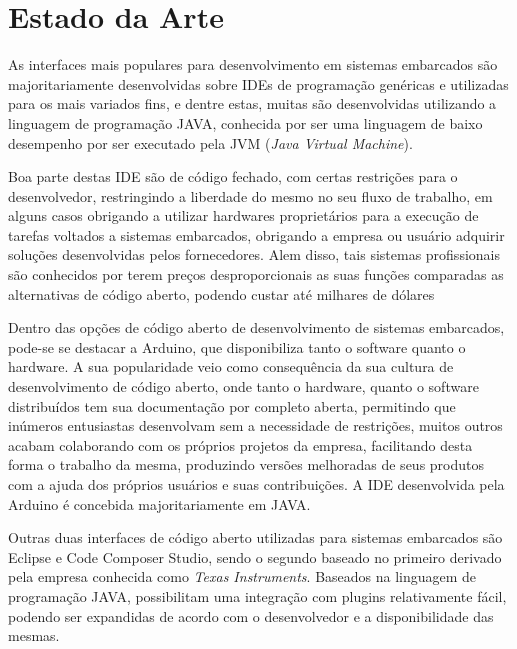 \chapter{Estado da Arte}
As interfaces mais populares para desenvolvimento em sistemas embarcados são majoritariamente desenvolvidas sobre IDEs de programação genéricas e utilizadas para os mais variados fins, e dentre estas, muitas são desenvolvidas utilizando a linguagem de programação JAVA, conhecida por ser uma linguagem de baixo desempenho por ser executado pela JVM (\textit{Java Virtual Machine})\cite{javaisbad}.


Boa parte destas IDE são de código fechado, com certas restrições para o desenvolvedor, restringindo a liberdade do mesmo no seu fluxo de trabalho, em alguns casos obrigando a utilizar hardwares proprietários para a execução de tarefas voltados a sistemas embarcados, obrigando a empresa ou usuário adquirir soluções desenvolvidas pelos fornecedores. Alem disso, tais sistemas profissionais são conhecidos por terem preços desproporcionais as suas funções comparadas as alternativas de código aberto, podendo custar até milhares de dólares %

Dentro das opções de código aberto de desenvolvimento de sistemas embarcados, pode-se se destacar a Arduino, que disponibiliza tanto o software quanto o hardware. A sua popularidade veio como consequência da sua cultura de desenvolvimento de código aberto, onde tanto o hardware, quanto o software distribuídos tem sua documentação por completo aberta, permitindo que inúmeros entusiastas desenvolvam sem a necessidade de restrições, muitos outros acabam colaborando com os próprios projetos da empresa, facilitando desta forma o trabalho da mesma, produzindo versões melhoradas de seus produtos com a ajuda dos próprios usuários e suas contribuições. A IDE desenvolvida pela Arduino é concebida majoritariamente em JAVA.

Outras duas interfaces de código aberto utilizadas para sistemas embarcados são Eclipse e Code Composer Studio, sendo o segundo baseado no primeiro
derivado pela empresa conhecida como \textit{Texas Instruments}. Baseados na linguagem de programação JAVA, possibilitam uma
integração com plugins relativamente fácil, podendo ser expandidas de acordo com o desenvolvedor e a disponibilidade das mesmas.

